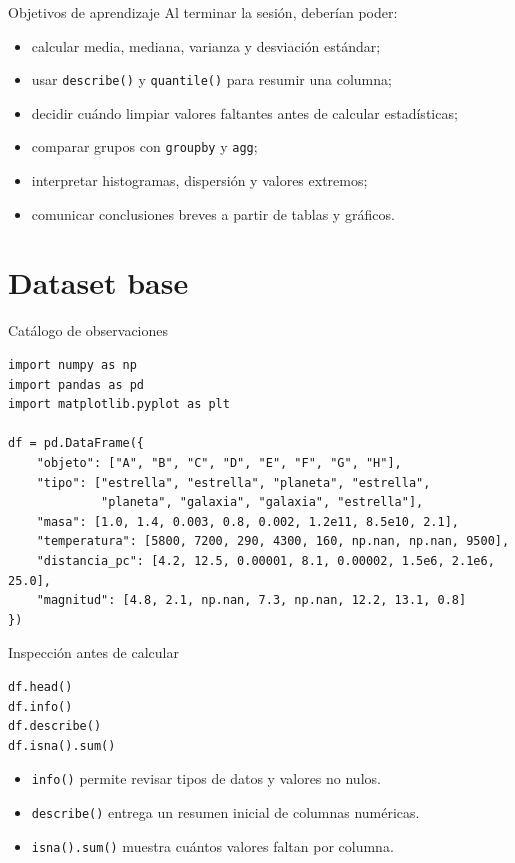 \documentclass[10pt]{beamer}
\begin{document}
\begin{frame}{Objetivos de aprendizaje}
  Al terminar la sesión, deberían poder:
  \begin{itemize}
    \item calcular media, mediana, varianza y desviación estándar;
    \item usar \texttt{describe()} y \texttt{quantile()} para resumir una columna;
    \item decidir cuándo limpiar valores faltantes antes de calcular estadísticas;
    \item comparar grupos con \texttt{groupby} y \texttt{agg};
    \item interpretar histogramas, dispersión y valores extremos;
    \item comunicar conclusiones breves a partir de tablas y gráficos.
  \end{itemize}
\end{frame}

\section{Dataset base}

\begin{frame}[fragile,shrink=6]{Catálogo de observaciones}
\begin{verbatim}
import numpy as np
import pandas as pd
import matplotlib.pyplot as plt

df = pd.DataFrame({
    "objeto": ["A", "B", "C", "D", "E", "F", "G", "H"],
    "tipo": ["estrella", "estrella", "planeta", "estrella",
             "planeta", "galaxia", "galaxia", "estrella"],
    "masa": [1.0, 1.4, 0.003, 0.8, 0.002, 1.2e11, 8.5e10, 2.1],
    "temperatura": [5800, 7200, 290, 4300, 160, np.nan, np.nan, 9500],
    "distancia_pc": [4.2, 12.5, 0.00001, 8.1, 0.00002, 1.5e6, 2.1e6, 25.0],
    "magnitud": [4.8, 2.1, np.nan, 7.3, np.nan, 12.2, 13.1, 0.8]
})
\end{verbatim}
\end{frame}

\begin{frame}[fragile]{Inspección antes de calcular}
\begin{verbatim}
df.head()
df.info()
df.describe()
df.isna().sum()
\end{verbatim}

  \begin{itemize}
    \item \texttt{info()} permite revisar tipos de datos y valores no nulos.
    \item \texttt{describe()} entrega un resumen inicial de columnas numéricas.
    \item \texttt{isna().sum()} muestra cuántos valores faltan por columna.
  \end{itemize}
\end{frame}
\end{document}
